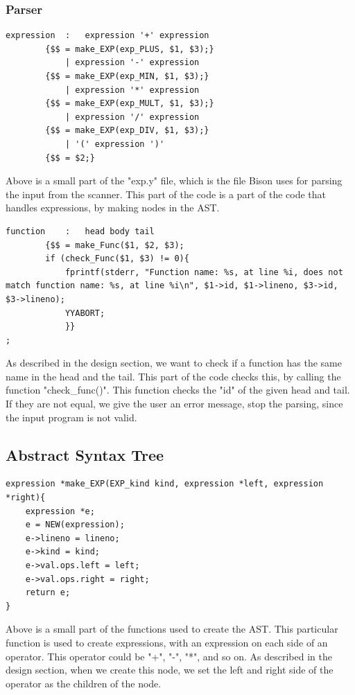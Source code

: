 \documentclass[a4paper,10pt,titlepage]{report}
\begin{document}
\subsubsection{Parser}
\begin{lstlisting}
expression  :   expression '+' expression
        {$$ = make_EXP(exp_PLUS, $1, $3);}
            | expression '-' expression
        {$$ = make_EXP(exp_MIN, $1, $3);}
            | expression '*' expression
        {$$ = make_EXP(exp_MULT, $1, $3);}
            | expression '/' expression
        {$$ = make_EXP(exp_DIV, $1, $3);}
            | '(' expression ')'
        {$$ = $2;}
\end{lstlisting}
Above is a small part of the "exp.y" file, which is the file Bison uses for parsing the input from the scanner. This part of the code is a part of the code that handles expressions, by making nodes in the AST.
\begin{lstlisting}
function    :   head body tail
        {$$ = make_Func($1, $2, $3);
        if (check_Func($1, $3) != 0){
            fprintf(stderr, "Function name: %s, at line %i, does not match function name: %s, at line %i\n", $1->id, $1->lineno, $3->id, $3->lineno);
            YYABORT;
            }}
;
\end{lstlisting}
As described in the design section, we want to check if a function has the same name in the head and the tail. This part of the code checks this, by calling the function "check\_func()". This function checks the "id" of the given head and tail. If they are not equal, we give the user an error message, stop the parsing, since the input program is not valid.
\subsection{Abstract Syntax Tree}
\begin{lstlisting}
expression *make_EXP(EXP_kind kind, expression *left, expression *right){
    expression *e;
    e = NEW(expression);
    e->lineno = lineno;
    e->kind = kind;
    e->val.ops.left = left;
    e->val.ops.right = right;
    return e;
}
\end{lstlisting}
Above is a small part of the functions used to create the AST. This particular function is used to create expressions, with an expression on each side of an operator. This operator could be "+", "-", "*", and so on. As described in the design section, when we create this node, we set the left and right side of the operator as the children of the node.
\end{document}
